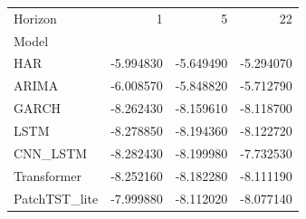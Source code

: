 \begin{tabular}{lrrr}
\toprule
Horizon & 1 & 5 & 22 \\
Model &  &  &  \\
\midrule
HAR & -5.994830 & -5.649490 & -5.294070 \\
ARIMA & -6.008570 & -5.848820 & -5.712790 \\
GARCH & -8.262430 & -8.159610 & -8.118700 \\
LSTM & -8.278850 & -8.194360 & -8.122720 \\
CNN_LSTM & -8.282430 & -8.199980 & -7.732530 \\
Transformer & -8.252160 & -8.182280 & -8.111190 \\
PatchTST_lite & -7.999880 & -8.112020 & -8.077140 \\
\bottomrule
\end{tabular}
